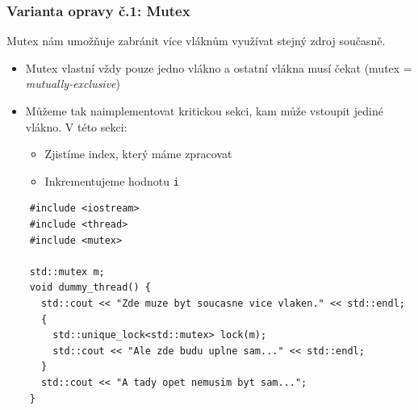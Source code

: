 \documentclass[usenames,dvipsnames,9pt]{beamer}
\begin{document}
\begin{frame}[fragile]
  \frametitle{Varianta opravy č.1: Mutex}
  
  Mutex nám umožňuje zabránit více vláknům využívat stejný zdroj současně.
  \begin{itemize}
    \item Mutex vlastní vždy pouze jedno vlákno a ostatní vlákna musí čekat (mutex = \emph{mutually-exclusive}) \\[0.7em]
    \pause
    \item Můžeme tak naimplementovat kritickou sekci, kam může vstoupit jediné vlákno. V této sekci:
          \begin{itemize}
            \item Zjistíme index, který máme zpracovat
            \item Inkrementujeme hodnotu \texttt{i}
          \end{itemize}
  \end{itemize}

  \pause
  \vspace{1em}

  \begin{verbatim}
    #include <iostream>
    #include <thread>
    #include <mutex>

    std::mutex m;
    void dummy_thread() {
      std::cout << "Zde muze byt soucasne vice vlaken." << std::endl;
      {
        std::unique_lock<std::mutex> lock(m);
        std::cout << "Ale zde budu uplne sam..." << std::endl;
      }
      std::cout << "A tady opet nemusim byt sam...";
    }
  \end{verbatim}

%

\end{frame}

%  
\end{document}
